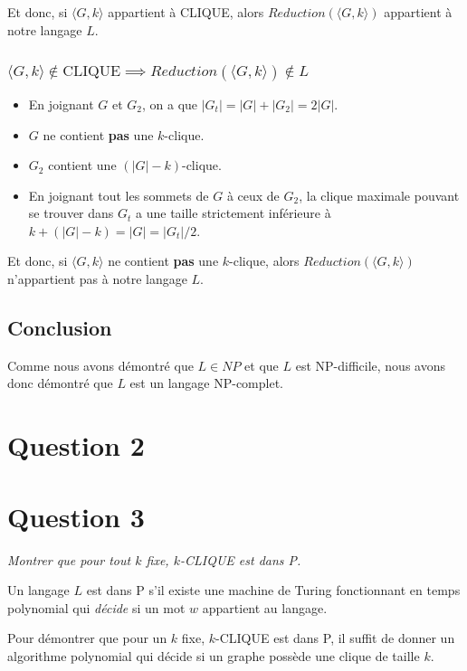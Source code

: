 \documentclass[10pt]{article}
\begin{document}
Et donc, si $\langle G,k \rangle$ appartient à CLIQUE, alors
$Reduction(\langle G,k \rangle)$ appartient à notre langage $L$.


\subsubsection{$\langle G,k \rangle \not\in \text{CLIQUE} \implies
  Reduction(\langle G,k \rangle) \not\in L$}

\begin{itemize}
\item En joignant $G$ et $G_2$, on a que $|G_t| = |G| + |G_2| = 2|G|$.
\item $G$ ne contient \textbf{pas} une $k$-clique.
\item $G_2$ contient une $(|G|-k)$-clique.
\item En joignant tout les sommets de $G$ à ceux de $G_2$, la clique
  maximale pouvant se trouver dans $G_t$ a une taille strictement
  inférieure à $k + (|G|-k) = |G| = |G_t|/2$.
\end{itemize}

Et donc, si $\langle G,k \rangle$ ne contient \textbf{pas} une
$k$-clique, alors $Reduction(\langle G,k \rangle)$ n'appartient pas à
notre langage $L$.

\subsection{Conclusion}

Comme nous avons démontré que $L \in NP$ et que $L$ est NP-difficile,
nous avons donc démontré que $L$ est un langage NP-complet.



\section{Question 2}


\newpage

\section{Question 3}

\emph{Montrer que pour tout $k$ fixe, $k$-CLIQUE est dans P.}

Un langage $L$ est dans P s'il existe une machine de Turing
fonctionnant en temps polynomial qui \emph{décide} si un mot $w$
appartient au langage.

Pour démontrer que pour un $k$ fixe, $k$-CLIQUE est dans P, il suffit
de donner un algorithme polynomial qui décide si un graphe possède une
clique de taille $k$.
\end{document}
